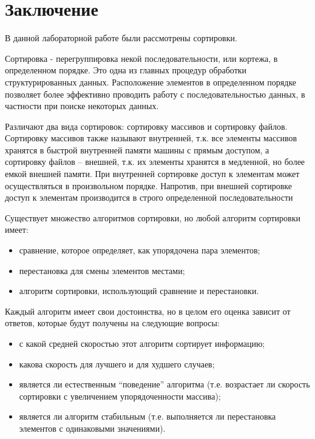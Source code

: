 \chapter*{Заключение}

В данной лабораторной работе были рассмотрены сортировки. 

Сортировка - перегруппировка некой последовательности, или кортежа, в определенном порядке. Это одна из главных процедур обработки структурированных данных. Расположение элементов в определенном порядке позволяет более эффективно проводить работу с последовательностью данных, в частности при поиске некоторых данных.

Различают два вида сортировок: сортировку массивов и сортировку файлов. Сортировку массивов также называют внутренней, т.к. все элементы массивов хранятся в быстрой внутренней памяти машины с прямым доступом, а сортировку файлов – внешней, т.к. их элементы хранятся в медленной, но более емкой внешней памяти. При внутренней сортировке доступ к элементам может осуществляться в
произвольном порядке. Напротив, при внешней сортировке доступ к элементам производится в строго определенной последовательности

Существует множество алгоритмов сортировки, но любой алгоритм сортировки имеет:
\begin{itemize}
	\item сравнение, которое определяет, как упорядочена пара элементов;
	\item перестановка для смены элементов местами;
	\item алгоритм сортировки, использующий сравнение и перестановки.
\end{itemize}

Каждый алгоритм имеет свои достоинства, но в целом его оценка зависит от ответов, которые будут получены на следующие вопросы:
\begin{itemize}
	\item с какой средней скоростью этот алгоритм сортирует информацию;
	\item какова скорость для лучшего и для худшего случаев;
	\item является ли естественным “поведение” алгоритма (т.е. возрастает ли скорость сортировки с увеличением упорядоченности массива);
	\item является ли алгоритм стабильным (т.е. выполняется ли перестановка элементов с одинаковыми значениями).
\end{itemize}


